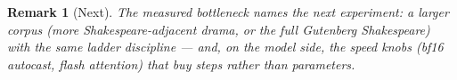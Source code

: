 \documentclass[11pt]{article}
\newtheorem{remark}{Remark}
\begin{document}
\begin{remark}[Next]
The measured bottleneck names the next experiment: a larger corpus
(more Shakespeare-adjacent drama, or the full Gutenberg Shakespeare)
with the same ladder discipline --- and, on the model side, the speed
knobs (bf16 autocast, flash attention) that buy steps rather than
parameters.
\end{remark}
\end{document}
